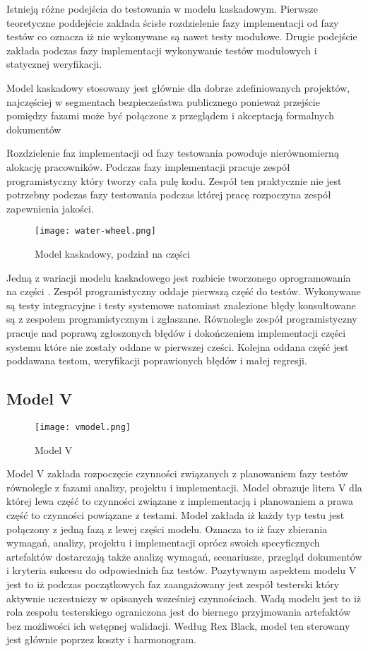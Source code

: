 Istnieją różne podejścia do testowania w modelu kaskadowym. Pierwsze teoretyczne poddejście zakłada ścisłe rozdzielenie fazy implementacji od fazy testów co oznacza iż nie wykonywane są nawet testy modułowe. Drugie podejście zakłada podczas fazy implementacji wykonywanie testów modułowych i statycznej weryfikacji.

Model kaskadowy stosowany jest głównie dla dobrze zdefiniowanych projektów, najczęściej w segmentach bezpieczeństwa publicznego ponieważ przejście pomiędzy fazami może być połączone z przeglądem i akceptacją formalnych dokumentów

Rozdzielenie faz implementacji od fazy testowania powoduje nierównomierną alokację pracowników. Podczas fazy implementacji pracuje zespół programistyczny który tworzy cała pulę kodu. Zespół ten praktycznie nie jest potrzebny podczas fazy testowania podczas której pracę rozpoczyna zespół zapewnienia jakości.
\begin{figure}[h]
\centerline{\texttt{[image: water-wheel.png]}}
\caption{Model kaskadowy, podział na części}
\label{fig:kaskadowyCzesci}
\end{figure}

Jedną z wariacji modelu kaskadowego jest rozbicie tworzonego oprogramowania na części \cite{TestingMatt}. 
Zespół programistyczny oddaje pierwszą część do testów. Wykonywane są testy integracyjne i testy systemowe natomiast znalezione błędy konsultowane są z zespołem programistycznym i zgłaszane. Równolegle zespół programistyczny pracuje nad poprawą zgłoszonych błędów i dokończeniem implementacji części systemu które nie zostały oddane w pierwszej cześci. Kolejna oddana część jest poddawana testom, weryfikacji poprawionych błędów i małej regresji.

 
 
\subsection{Model V}

\begin{figure}[h]
\centerline{\texttt{[image: vmodel.png]}}
\caption{Model V}
\label{fig:vmodel}
\end{figure}
Model V zakłada rozpoczęcie czynności związanych z planowaniem fazy testów równolegle z fazami analizy, projektu i implementacji. Model obrazuje litera V dla której lewa część to czynności związane z implementacją i planowaniem a prawa część to czynności powiązane z testami. Model zakłada iż każdy typ testu jest połączony z jedną fazą z lewej części modelu. Oznacza to iż fazy zbierania wymagań, analizy, projektu i implementacji oprócz swoich specyficznych artefaktów dostarczają także analizę wymagań, scenariusze, przegląd dokumentów i kryteria sukcesu do odpowiednich faz testów.
Pozytywnym aspektem modelu V jest to iż podczas początkowych faz zaangażowany jest zespół testerski który aktywnie uczestniczy w opisanych wsześniej czynnościach. Wadą modelu jest to iż rola zespołu testerskiego ograniczona jest do biernego przyjmowania artefaktów bez możliwości ich wstępnej walidacji.  Według Rex Black, model ten sterowany jest głównie poprzez koszty i harmonogram.
